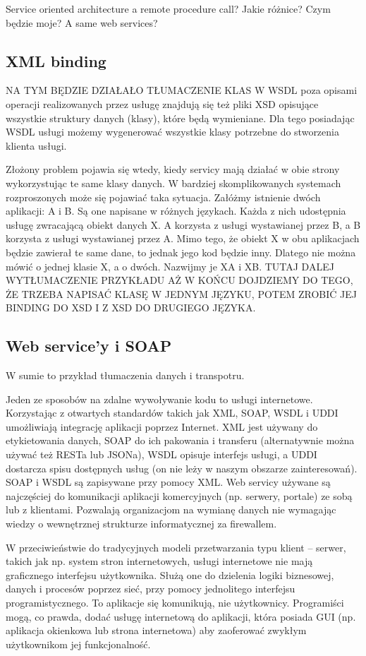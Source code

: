 \documentclass[twoside,a4paper]{book}
\begin{document}
Service oriented architecture a remote procedure call? Jakie różnice? Czym będzie moje? A same web services?

\subsection{XML binding}
NA TYM BĘDZIE DZIAŁAŁO TŁUMACZENIE KLAS
W WSDL poza opisami operacji realizowanych przez usługę znajdują się też pliki XSD opisujące wszystkie struktury danych (klasy), które będą wymieniane. Dla tego posiadając WSDL usługi możemy wygenerować wszystkie klasy potrzebne do stworzenia klienta usługi.

Złożony problem pojawia się wtedy, kiedy servicy mają działać w obie strony wykorzystując te same klasy danych. W bardziej skomplikowanych systemach rozproszonych może się pojawiać taka sytuacja. Załóżmy istnienie dwóch aplikacji: A i B. Są one napisane w różnych językach. Każda z nich udostępnia usługę zwracającą obiekt danych X. A korzysta z usługi wystawianej przez B, a B korzysta z usługi wystawianej przez A. Mimo tego, że obiekt X w obu aplikacjach będzie zawierał te same dane, to jednak jego kod będzie inny. Dlatego nie można mówić o jednej klasie X, a o dwóch. Nazwijmy je XA i XB. TUTAJ DALEJ WYTŁUMACZENIE PRZYKŁADU AŻ W KOŃCU DOJDZIEMY DO TEGO, ŻE TRZEBA NAPISAĆ KLASĘ W JEDNYM JĘZYKU, POTEM ZROBIĆ JEJ BINDING DO XSD I Z XSD DO DRUGIEGO JĘZYKA. 

\subsection{Web service'y i SOAP}
W sumie to przykład tłumaczenia danych  i transpotru.

Jeden ze sposobów na zdalne wywoływanie kodu to usługi internetowe. Korzystając z otwartych standardów takich jak XML, SOAP, WSDL i UDDI umożliwiają integrację aplikacji poprzez Internet. XML jest używany do etykietowania danych, SOAP do ich pakowania i transferu (alternatywnie można używać też RESTa lub JSONa), WSDL opisuje interfejs usługi, a UDDI dostarcza spisu dostępnych usług (on nie leży w naszym obszarze zainteresowań). SOAP i WSDL są zapisywane przy pomocy XML. Web servicy używane są najczęściej do komunikacji aplikacji komercyjnych (np. serwery, portale) ze sobą lub z klientami. Pozwalają organizacjom na wymianę danych nie wymagając wiedzy o wewnętrznej strukturze informatycznej za firewallem.

W przeciwieństwie do tradycyjnych modeli przetwarzania typu klient – serwer, takich jak np. system stron internetowych, usługi internetowe nie mają graficznego interfejsu użytkownika. Służą one do dzielenia logiki biznesowej, danych i procesów poprzez sieć, przy pomocy jednolitego interfejsu programistycznego. To aplikacje się komunikują, nie użytkownicy. Programiści mogą, co prawda, dodać usługę internetową do aplikacji, która posiada GUI (np. aplikacja okienkowa lub strona internetowa) aby zaoferować zwykłym użytkownikom jej funkcjonalność.
\end{document}
